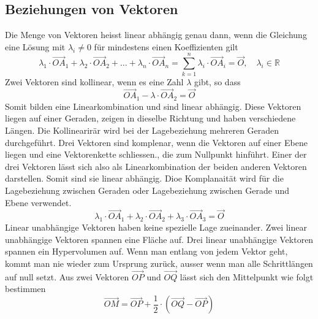 \subsection{Beziehungen von Vektoren}
Die Menge von Vektoren heisst linear abhängig genau dann, wenn die Gleichung eine Lösung mit $\lambda_i\neq 0$ für mindestens einen Koeffizienten gilt
\begin{equation}
\boxed{\lambda_1\cdot \overrightarrow{OA}_1+\lambda_2\cdot \overrightarrow{OA}_2+\dotso+\lambda_n\cdot \overrightarrow{OA}_n=\displaystyle \sum_{k=1}^n\lambda_i\cdot \overrightarrow{OA}_i=\overrightarrow{O},\quad \lambda_i\in \mathbb{R}}
\end{equation}
Zwei Vektoren sind kollinear, wenn es eine Zahl $\lambda$ gibt, so dass
\begin{equation}
\boxed{\overrightarrow{OA}_1-\lambda\cdot \overrightarrow{OA}_2=\overrightarrow{O}}
\end{equation}
Somit bilden eine Linearkombination und sind linear abhängig. Diese Vektoren liegen auf einer Geraden, zeigen in dieselbe Richtung und haben verschiedene Längen. Die Kollinearirär wird bei der Lagebeziehung mehreren Geraden durchgeführt.
\newline\newline
Drei Vektoren sind komplenar, wenn die Vektoren auf einer Ebene liegen und eine Vektorenkette schliessen., die zum Nullpunkt hinführt. Einer der drei Vektoren lässt sich also als Linearkombination der beiden anderen Vektoren darstellen. Somit sind sie linear abhängig. Dioe Komplanaität wird für die Lagebeziehung zwischen Geraden oder Lagebeziehung zwischen Gerade und Ebene verwendet.
\begin{equation}
\boxed{\lambda_1\cdot \overrightarrow{OA}_1+\lambda_2\cdot \overrightarrow{OA}_2+\lambda_3\cdot \overrightarrow{OA}_3=\overrightarrow{O}}
\end{equation}
Linear unabhängige Vektoren haben keine spezielle Lage zueinander. Zwei linear unabhängige Vektoren spannen eine Fläche auf. Drei linear unabhängige Vektoren spannen ein Hypervolumen auf. Wenn man entlang von jedem Vektor geht, kommt man nie wieder zum Ursprung zurück, ausser wenn man alle Schrittlängen auf null setzt.
\newline\newline
Aus zwei Vektoren $\overrightarrow{OP}$ und $\overrightarrow{OQ}$ lässt sich den Mittelpunkt wie folgt bestimmen
\begin{equation}
\boxed{\overrightarrow{OM}=\overrightarrow{OP}+\dfrac{1}{2}\cdot\left(\overrightarrow{OQ}-\overrightarrow{OP}\right)}
\end{equation}
